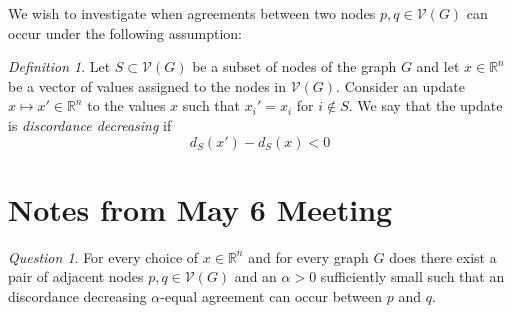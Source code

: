 \documentclass{article}
\theoremstyle{remark}
\newtheorem{definition}{Definition}
\newtheorem{question}{Question}
\newcommand{\R}[0]{\mathbb{R}}
\begin{document}
We wish to investigate when agreements between two nodes $p,q\in\mathcal{V}(G)$ can occur under the following assumption:

\begin{definition}{\label{defn:discordanceDecreasingUpdate}}
	Let $S\subset\mathcal{V}(G)$ be a subset of nodes of the graph $G$ and let $x\in\R^n$ be a vector of values assigned to the nodes in $\mathcal{V}(G)$. Consider an update $x\mapsto x'\in\R^n$ to the values $x$ such that $x_i' = x_i$ for $i\not\in S$. We say that the update is \textit{discordance decreasing} if 
	\begin{equation*}
	d_S(x')-d_S(x) < 0
	\end{equation*}
\end{definition}

\section{Notes from May 6 Meeting}

\begin{question}{\label{question:updatePairExistence}}
For every choice of $x\in\R^n$ and for every graph $G$ does there exist a pair of adjacent nodes $p,q\in\mathcal{V}(G)$ and an $\alpha>0$ sufficiently small such that an discordance decreasing $\alpha$-equal agreement can occur between $p$ and $q$.  
\end{question}
\end{document}
